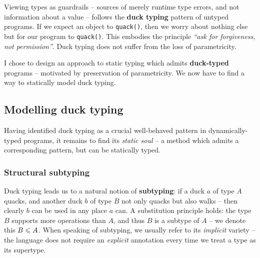 \begin{description}
    Viewing types as guardrails -- sources of merely runtime type errors, and not information about a value -- follows the \textbf{duck typing} pattern \cite{duck-typing} of untyped programs. If we expect an object to \texttt{quack()}, then we worry about nothing else but for our program to \texttt{quack()}. This embodies the principle \textit{\enquote{ask for forgiveness, not permission}}.
    Duck typing does not suffer from the loss of parametricity.
\end{description}
I chose to design an approach to static typing which admits \textbf{duck-typed} programs -- motivated by preservation of parametricity. 
We now have to find a way to statically model duck typing.

\subsection{Modelling duck typing}
\label{subsec:duck-models}

Having identified duck typing as a crucial well-behaved pattern in dynamically-typed programs, it remains to find its \emph{static soul} -- a method which admits a corresponding pattern, but can be statically typed.

\subsubsection{Structural subtyping}

Duck typing leads us to a natural notion of \textbf{subtyping}: if a duck $a$ of type $A$ quacks, and another duck $b$ of type $B$ not only quacks but also walks -- then clearly $b$ can be used in any place $a$ can. A substitution principle holds: the type $B$ supports more operations than $A$, and thus $B$ is a subtype of $A$ \cite{tapl} -- we denote this $B \leqslant A$. When speaking of subtyping, we usually refer to its \emph{implicit} variety -- the language does not require an \emph{explicit} annotation every time we treat a type as its supertype.

